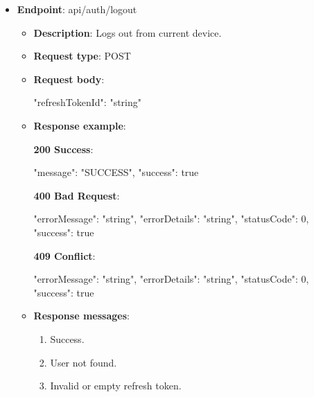 \begin{itemize}
\begin{itemize}
        \textbf{409 Conflict}:

        \begin{spverbatim}
        {
            "errorMessage": "string",
            "errorDetails": "string",
            "statusCode": 0,
            "success": false
        }
        \end{spverbatim}
        \item \textbf{Response messages}:
        \begin{enumerate}
            \item Success.
            \item Invalid or empty refresh token.
        \end{enumerate}
    \end{itemize}

    \item \textbf{Endpoint}: api/auth/logout
    \begin{itemize}
        \item \textbf{Description}: Logs out from current device.
        \item \textbf{Request type}: POST
        \item \textbf{Request body}:
        \begin{spverbatim}
        {
            "refreshTokenId": "string"
        }
        \end{spverbatim}
        \item  \textbf{Response example}:

        \textbf{200 Success}:

        \begin{spverbatim}
        {
            "message": "SUCCESS",
            "success": true
        }
        \end{spverbatim}

        \textbf{400 Bad Request}:

        \begin{spverbatim}
        {
            "errorMessage": "string",
            "errorDetails": "string",
            "statusCode": 0,
            "success": true
        }
        \end{spverbatim}

        \textbf{409 Conflict}:

        \begin{spverbatim}
        {
            "errorMessage": "string",
            "errorDetails": "string",
            "statusCode": 0,
            "success": true
        }
        \end{spverbatim}
        \item \textbf{Response messages}:
        \begin{enumerate}
            \item Success.
            \item User not found.
            \item Invalid or empty refresh token.
        \end{enumerate}
    \end{itemize}


\end{itemize}
